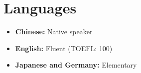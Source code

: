 \documentclass[letterpaper,11pt]{article}
\makeatletter
\newcommand{\resumeItem}[1]{
  \item\small{
    {#1 \vspace{-2pt}}
  }
}
\newcommand{\resumeProjectHeading}[2]{
    \vspace{-2pt}\item
    \begin{tabular*}{0.97\textwidth}{l@{\extracolsep{\fill}}r}
      \small#1 & #2 \\
    \end{tabular*}\vspace{-7pt}
}
\newcommand{\resumeSubHeadingListStart}{\begin{itemize}[leftmargin=0.15in, label={}]}
\newcommand{\resumeSubHeadingListEnd}{\end{itemize}}
\newcommand{\resumeItemListStart}{\begin{itemize}}
\newcommand{\resumeItemListEnd}{\end{itemize}\vspace{-5pt}}
\makeatother
\begin{document}
\section{Languages} \vspace{3pt}
\resumeItemListStart
\resumeItem{\textbf{Chinese:} Native speaker}
\resumeItem{\textbf{English:} Fluent (TOEFL: 100)}
\resumeItem{\textbf{Japanese and Germany:} Elementary}
\resumeItemListEnd
%
%
%
%
%
%

\end{document}
